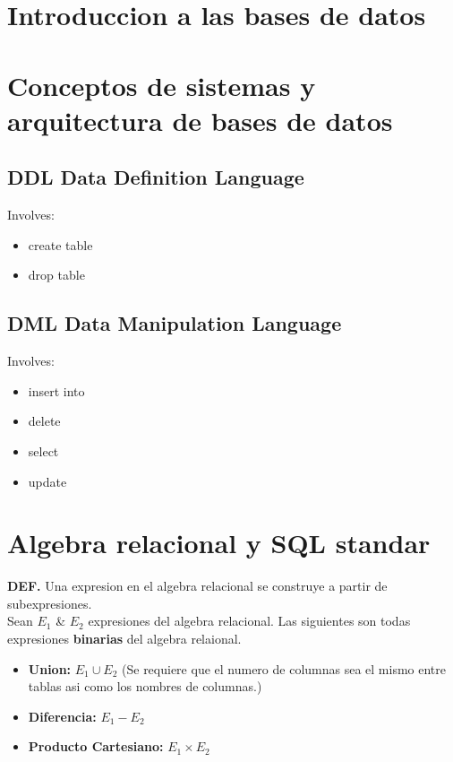 \documentclass[twoside]{article}
\begin{document}
\null
\thispagestyle{empty}
\newpage
{}
\selectfont
\tableofcontents
\newpage
\cleardoublepage
\section{Introduccion a las bases de datos}
\section{Conceptos de sistemas y arquitectura de bases de datos}
\subsection{DDL Data Definition Language}
Involves:
\begin{itemize}
	\item create table
	\item drop table
\end{itemize}

\subsection{DML Data Manipulation Language}
Involves:
\begin{itemize}
	\item insert into
	\item delete
	\item select
	\item update
\end{itemize}
\section{Algebra relacional y SQL standar}
\textbf{DEF.} Una expresion en el algebra relacional se construye a partir de subexpresiones.\\

Sean $E_1$ \& $E_2$ expresiones del algebra relacional. Las siguientes son todas expresiones \textbf{binarias} del algebra relaional.\\

\begin{itemize}
  \item \textbf{Union:} $E_1 \cup E_2$ (Se requiere que el numero de columnas sea el mismo entre tablas asi como los nombres de columnas.)
  \item \textbf{Diferencia:} $E_1 - E_2$
  \item \textbf{Producto Cartesiano:} $E_1 \times E_2$
\end{itemize}
\end{document}
